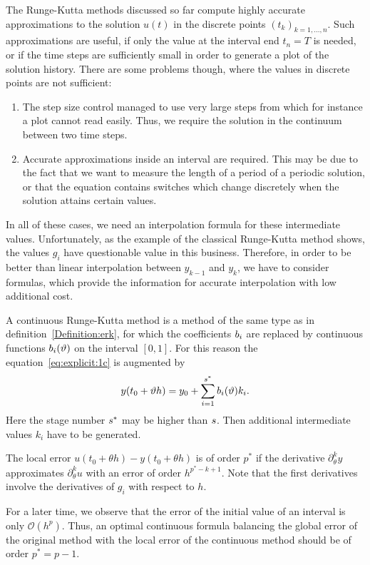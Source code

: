 \begin{intro}
  The Runge-Kutta methods discussed so far compute highly accurate
  approximations to the solution $u(t)$ in the discrete points
  $(t_k)_{k=1,\dots,n}$. Such approximations are useful, if only the
  value at the interval end $t_n=T$ is needed, or if the time steps
  are sufficiently small in order to generate a plot of the solution
  history. There are some problems though, where the values in
  discrete points are not sufficient:
  \begin{enumerate}
  \item The step size control managed to use very large steps from
    which for instance a plot cannot read easily. Thus, we require the
    solution in the continuum between two time steps.
  \item Accurate approximations inside an interval are required. This
    may be due to the fact that we want to measure the length of a
    period of a periodic solution, or that the equation contains
    switches which change discretely when the solution attains certain
    values.
  \end{enumerate}
  In all of these cases, we need an interpolation formula for these
  intermediate values. Unfortunately, as the example of the classical
  Runge-Kutta method shows, the values $g_i$ have questionable value
  in this business. Therefore, in order to be better than linear
  interpolation between $y_{k-1}$ and $y_k$, we have to consider
  formulas, which provide the information for accurate interpolation
  with low additional cost.
\end{intro}

\begin{definition}
  A continuous Runge-Kutta method is a method of the same type as in 
  definition~\ref{Definition:erk}, for which the coefficients $b_i$ are replaced 
	by continuous functions $b_i(\vartheta)$ on the interval $[0,1]$.
  For this reason the equation~\eqref{eq:explicit:1c} is augmented by
  \begin{equation}
    \label{eq:explicit:24}
    y(t_0+ \vartheta h) = y_0 + \sum\limits_{i=1}^{s^*} b_i (\vartheta) k_i.
  \end{equation}
  Here the stage number $s^*$ may be higher than $s$. 
  Then additional intermediate values $k_i$ have to be generated.
\end{definition}

\begin{remark}
  The local error $u(t_0+\theta h) - y(t_0+\theta h)$ is of order
  $p^*$ if the derivative $\partial_\theta^k y$ approximates
  $\partial_\theta^k u$ with an error of order $h^{p^*-k+1}$. Note that
  the first derivatives involve the derivatives of $g_i$ with respect
  to $h$.
  
  For a later time, we observe that the error of the initial value of
  an interval is only $\mathcal O(h^p)$. Thus, an optimal continuous
  formula balancing the global error of the original method with the
  local error of the continuous method should be of order
  $p^*=p-1$.
\end{remark}

